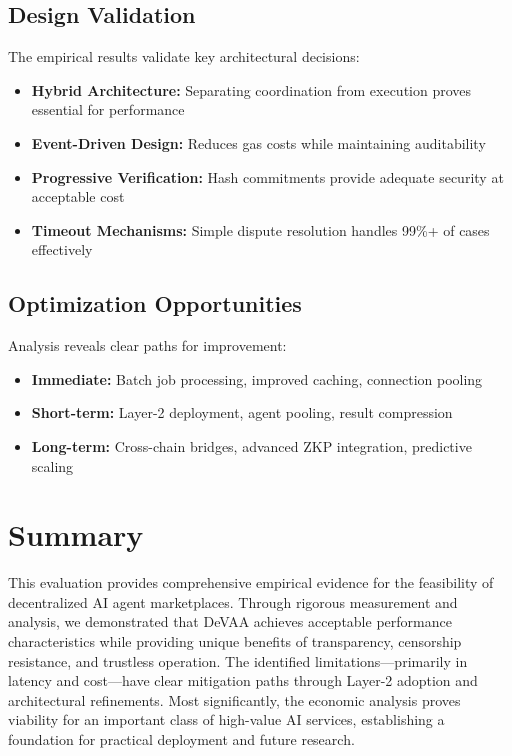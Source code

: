 \subsection{Design Validation}

The empirical results validate key architectural decisions:
\begin{itemize}
    \item \textbf{Hybrid Architecture:} Separating coordination from execution proves essential for performance
    \item \textbf{Event-Driven Design:} Reduces gas costs while maintaining auditability
    \item \textbf{Progressive Verification:} Hash commitments provide adequate security at acceptable cost
    \item \textbf{Timeout Mechanisms:} Simple dispute resolution handles 99\%+ of cases effectively
\end{itemize}

\subsection{Optimization Opportunities}

Analysis reveals clear paths for improvement:
\begin{itemize}
    \item \textbf{Immediate:} Batch job processing, improved caching, connection pooling
    \item \textbf{Short-term:} Layer-2 deployment, agent pooling, result compression
    \item \textbf{Long-term:} Cross-chain bridges, advanced ZKP integration, predictive scaling
\end{itemize}

\section{Summary}

This evaluation provides comprehensive empirical evidence for the feasibility of decentralized AI agent marketplaces. Through rigorous measurement and analysis, we demonstrated that DeVAA achieves acceptable performance characteristics while providing unique benefits of transparency, censorship resistance, and trustless operation. The identified limitations—primarily in latency and cost—have clear mitigation paths through Layer-2 adoption and architectural refinements. Most significantly, the economic analysis proves viability for an important class of high-value AI services, establishing a foundation for practical deployment and future research.
